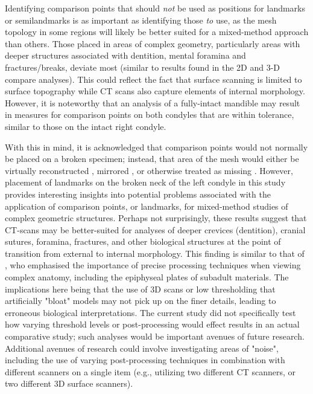 \documentclass[review]{elsarticle}
\begin{document}
Identifying comparison points that should \textit{not} be used as positions for landmarks or semilandmarks is as important as identifying those \textit{to} use, as the mesh topology in some regions will likely be better suited for a mixed-method approach than others. Those placed in areas of complex geometry, particularly areas with deeper structures associated with dentition, mental foramina and fractures/breaks, deviate most (similar to results found in the 2D and 3-D compare analyses). This could reflect the fact that surface scanning is limited to surface topography while CT scans also capture elements of internal morphology. However, it is noteworthy that an analysis of a fully-intact mandible may result in measures for comparison points on both condyles that are within tolerance, similar to those on the intact right condyle.

With this in mind, it is acknowledged that comparison points would not normally be placed on a broken specimen; instead, that area of the mesh would either be virtually reconstructed \citep{RN11496,RN5889,Heid1,RN5903,RN5904}, mirrored \citep{RN11497}, or otherwise treated as missing \citep{RN11500,RN11497,RN11498,RN11499}. However, placement of landmarks on the broken neck of the left condyle in this study provides interesting insights into potential problems associated with the application of comparison points, or landmarks, for mixed-method studies of complex geometric structures. Perhaps not surprisingly, these results suggest that CT-scans may be better-suited for analyses of deeper crevices (dentition), cranial sutures, foramina, fractures, and other biological structures at the point of transition from external to internal morphology. This finding is similar to that of \citet{RN8984}, who emphasised the importance of precise processing techniques when viewing complex anatomy, including the epiphyseal plates of subadult materials. The implications here being that the use of 3D scans or low thresholding that artificially "bloat" models may not pick up on the finer details, leading to erroneous biological interpretations. The current study did not specifically test how varying threshold levels or post-processing would effect results in an actual comparative study; such analyses would be important avenues of future research. Additional avenues of research could involve investigating areas of "noise", including the use of varying post-processing techniques in combination with different scanners on a single item (e.g., utilizing two different CT scanners, or two different 3D surface scanners).
\end{document}
